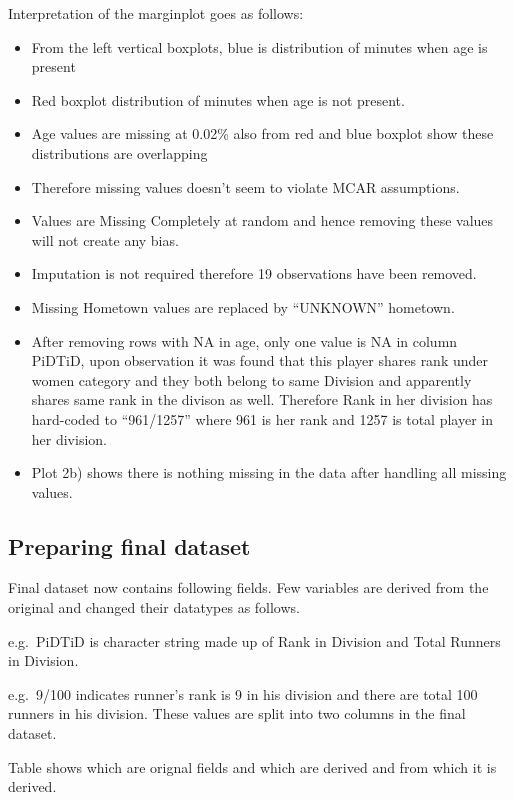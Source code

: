 \documentclass[
]{article}
\providecommand{\tightlist}{%
  \setlength{\itemsep}{0pt}\setlength{\parskip}{0pt}}
\begin{document}
Interpretation of the marginplot goes as follows:

\begin{itemize}
\tightlist
\item
  From the left vertical boxplots, blue is distribution of minutes when
  age is present
\item
  Red boxplot distribution of minutes when age is not present.
\item
  Age values are missing at 0.02\% also from red and blue boxplot show
  these distributions are overlapping
\item
  Therefore missing values doesn't seem to violate MCAR assumptions.
\item
  Values are Missing Completely at random and hence removing these
  values will not create any bias.
\item
  Imputation is not required therefore 19 observations have been
  removed.
\item
  Missing Hometown values are replaced by ``UNKNOWN'' hometown.
\item
  After removing rows with NA in age, only one value is NA in column
  PiDTiD, upon observation it was found that this player shares rank
  under women category and they both belong to same Division and
  apparently shares same rank in the divison as well. Therefore Rank in
  her division has hard-coded to ``961/1257'' where 961 is her rank and
  1257 is total player in her division.
\item
  Plot 2b) shows there is nothing missing in the data after handling all
  missing values.
\end{itemize}

\hypertarget{preparing-final-dataset}{%
\subsection{Preparing final dataset}\label{preparing-final-dataset}}

Final dataset now contains following fields. Few variables are derived
from the original and changed their datatypes as follows.

e.g.~PiDTiD is character string made up of Rank in Division and Total
Runners in Division.

e.g.~9/100 indicates runner's rank is 9 in his division and there are
total 100 runners in his division. These values are split into two
columns in the final dataset.

Table shows which are orignal fields and which are derived and from
which it is derived.
\end{document}
